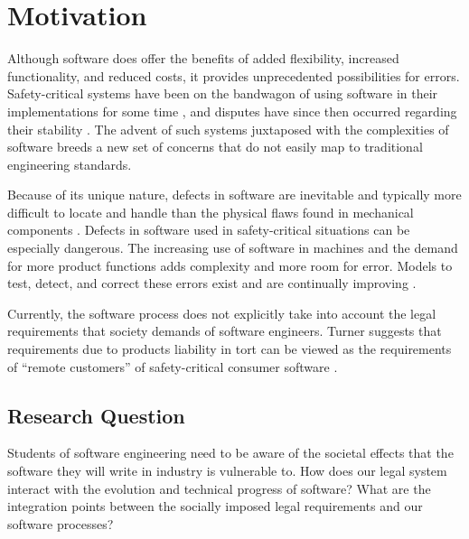 \chapter{Motivation}

Although software does offer the benefits of added flexibility, increased
functionality, and reduced costs, it provides unprecedented possibilities for
errors. Safety-critical systems have been on the bandwagon of using software in
their implementations for some time \cite{Graupe78,Hurtig94}, and disputes have
since then occurred regarding their stability \cite{Therac25,Maisel05}. The 
advent of such systems juxtaposed with the complexities of software breeds a new
set of concerns that do not easily map to traditional engineering standards.

Because of its unique nature, defects in software are inevitable and typically
more difficult to locate and handle than the physical flaws found in mechanical
components \cite{Parnas90}. Defects in software used in safety-critical
situations can be especially dangerous. The increasing use of software in
machines and the demand for more product functions adds complexity and more room
for error. Models to test, detect, and correct these errors exist and are
continually improving \cite{Parnas90}.

Currently, the software process does not explicitly take into account the legal
requirements that society demands of software engineers. Turner suggests that
requirements due to products liability in tort can be viewed as the requirements
of ``remote customers'' of safety-critical consumer software \cite{Turner99}.

\section{Research Question}

Students of software engineering need to be aware of the societal effects that
the software they will write in industry is vulnerable to. How does our legal
system interact with the evolution and technical progress of software? What are
the integration points between the socially imposed legal requirements and our
software processes?
